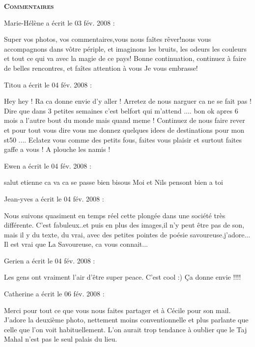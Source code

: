 \bigskip
\textbf{\textsc{Commentaires}}

\medskip
Marie-Hélène a écrit le 03 fév. 2008 :
\begin{displayquote}
Super vos photos, vos commentaires,vous nous faîtes rêver!nous vous accompagnons dans vôtre périple, et imaginons les bruits, les odeurs les couleurs et tout ce qui va avec la magie de ce pays!
Bonne continuation, continuez à faire de belles rencontres, et faîtes attention à vous
Je vous embrasse!
\end{displayquote}

\medskip
Titou a écrit le 04 fév. 2008 :
\begin{displayquote}
Hey hey ! Ra ca donne envie d'y aller ! Arretez de nous narguer ca ne se fait pas ! Dire que dans 3 petites semaines c'est belfort qui m'attend .... bon ok apres 6 mois a l'autre bout du monde mais quand meme ! Continuez de nous faire rever et pour tout vous dire vous me donnez quelques idees de destinations pour mon st50 ....
Eclatez vous comme des petits fous, faites vous plaisir et surtout faites gaffe a vous ! A plouche les namis !
\end{displayquote}

\medskip
Ewen a écrit le 04 fév. 2008 :
\begin{displayquote}
salut etienne ca va ca se passe	bien
bisous  Moi et Nils pensont bien a toi
\end{displayquote}

\medskip
Jean-yves a écrit le 04 fév. 2008 :
\begin{displayquote}
Nous suivons quasiment en temps réel cette plongée dans une société très différente. C'est fabuleux..et puis en plus des images,il n'y peut être pas de son, mais il y du texte, du vrai, avec des petites pointes de poésie  savoureuse.j'adore...
Il est vrai que La Savoureuse, ca vous connait...
\end{displayquote}

\medskip
Gerien a écrit le 04 fév. 2008 :
\begin{displayquote}
Les gens ont vraiment l'air d'être super peace. C'est cool :)
Ça donne envie !!!!
\end{displayquote}

\medskip
Catherine a écrit le 06 fév. 2008 :
\begin{displayquote}
Merci pour tout ce que vous nous faites partager et à Cécile pour son mail.
        J'adore la deuxième photo, nettement moins conventionnelle et plus parlante que celle que l'on voit habituellement. L'on aurait trop tendance à oublier que le Taj Mahal n'est pas le seul palais du lieu.
\end{displayquote}

